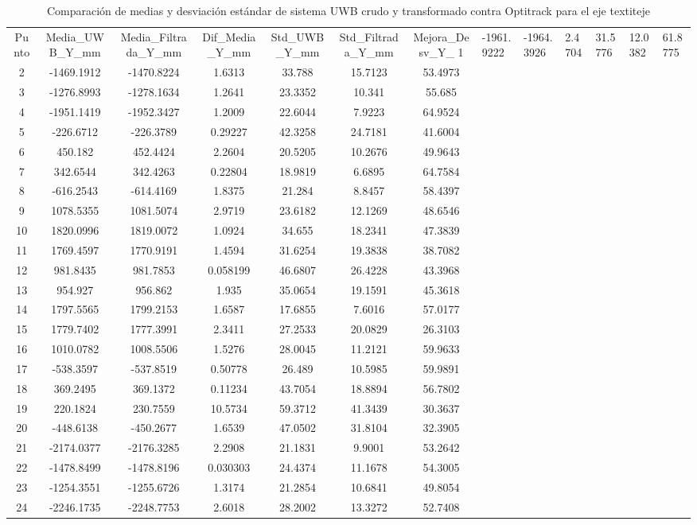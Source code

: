 \begin{table}[H]
\centering
\begin{tabular}{c c c c c c c }
\hline
Punto & Media\_UWB\_Y\_mm & Media\_Filtrada\_Y\_mm & Dif\_Media\_Y\_mm & Std\_UWB\_Y\_mm & Std\_Filtrada\_Y\_mm & Mejora\_Desv\_Y\_%
1 & -1961.9222 & -1964.3926 & 2.4704 & 31.5776 & 12.0382 & 61.8775\\ 
2 & -1469.1912 & -1470.8224 & 1.6313 & 33.788 & 15.7123 & 53.4973\\ 
3 & -1276.8993 & -1278.1634 & 1.2641 & 23.3352 & 10.341 & 55.685\\ 
4 & -1951.1419 & -1952.3427 & 1.2009 & 22.6044 & 7.9223 & 64.9524\\ 
5 & -226.6712 & -226.3789 & 0.29227 & 42.3258 & 24.7181 & 41.6004\\ 
6 & 450.182 & 452.4424 & 2.2604 & 20.5205 & 10.2676 & 49.9643\\ 
7 & 342.6544 & 342.4263 & 0.22804 & 18.9819 & 6.6895 & 64.7584\\ 
8 & -616.2543 & -614.4169 & 1.8375 & 21.284 & 8.8457 & 58.4397\\ 
9 & 1078.5355 & 1081.5074 & 2.9719 & 23.6182 & 12.1269 & 48.6546\\ 
10 & 1820.0996 & 1819.0072 & 1.0924 & 34.655 & 18.2341 & 47.3839\\ 
11 & 1769.4597 & 1770.9191 & 1.4594 & 31.6254 & 19.3838 & 38.7082\\ 
12 & 981.8435 & 981.7853 & 0.058199 & 46.6807 & 26.4228 & 43.3968\\ 
13 & 954.927 & 956.862 & 1.935 & 35.0654 & 19.1591 & 45.3618\\ 
14 & 1797.5565 & 1799.2153 & 1.6587 & 17.6855 & 7.6016 & 57.0177\\ 
15 & 1779.7402 & 1777.3991 & 2.3411 & 27.2533 & 20.0829 & 26.3103\\ 
16 & 1010.0782 & 1008.5506 & 1.5276 & 28.0045 & 11.2121 & 59.9633\\ 
17 & -538.3597 & -537.8519 & 0.50778 & 26.489 & 10.5985 & 59.9891\\ 
18 & 369.2495 & 369.1372 & 0.11234 & 43.7054 & 18.8894 & 56.7802\\ 
19 & 220.1824 & 230.7559 & 10.5734 & 59.3712 & 41.3439 & 30.3637\\ 
20 & -448.6138 & -450.2677 & 1.6539 & 47.0502 & 31.8104 & 32.3905\\ 
21 & -2174.0377 & -2176.3285 & 2.2908 & 21.1831 & 9.9001 & 53.2642\\ 
22 & -1478.8499 & -1478.8196 & 0.030303 & 24.4374 & 11.1678 & 54.3005\\ 
23 & -1254.3551 & -1255.6726 & 1.3174 & 21.2854 & 10.6841 & 49.8054\\ 
24 & -2246.1735 & -2248.7753 & 2.6018 & 28.2002 & 13.3272 & 52.7408\\ 
\hline
\end{tabular}
\caption{Comparación de medias y desviación estándar de sistema UWB crudo y transformado contra Optitrack para el eje textit{eje}}
\end{table}
